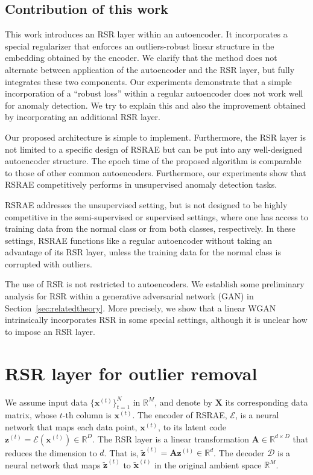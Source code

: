 \documentclass{article} \usepackage{iclr2020_conference,times}
\def\Secref#1{Section~\ref{#1}}
\def\rvx{{\mathbf{x}}}
\def\rvz{{\mathbf{z}}}
\def\rmA{{\mathbf{A}}}
\def\rmX{{\mathbf{X}}}
\newcommand{\R}{\mathbb{R}}
\begin{document}
\subsection{Contribution of this work}
\label{subsec:contribution}
This work introduces an RSR layer within an autoencoder. 
It incorporates a special regularizer that enforces an outliers-robust linear structure in the embedding obtained by the encoder. 
We clarify that the method does not alternate between application of the autoencoder and the RSR layer, but fully integrates these two components. Our experiments demonstrate that a simple incorporation of a ``robust loss'' within a regular autoencoder does not work well for anomaly detection. We try to explain this and also the improvement obtained by incorporating an additional RSR layer.


Our proposed architecture is simple to implement. Furthermore, the RSR layer is not limited to a specific design of RSRAE but can be put into any well-designed autoencoder structure. 
The epoch time of the proposed algorithm is comparable to those of other common autoencoders. 
Furthermore, our experiments show that RSRAE competitively performs in unsupervised anomaly detection tasks.

{RSRAE addresses the unsupervised setting, but is not designed to be highly competitive in the semi-supervised or supervised settings, where one has access to training data from the normal class or from both classes, respectively. In these settings, RSRAE functions like a regular autoencoder without taking an advantage of its RSR layer, unless the training data for the normal class is  corrupted with outliers.}



The use of RSR is not restricted to autoencoders. 
We establish some preliminary analysis for RSR within a generative adversarial network (GAN) \citep{goodfellow2014generative, arjovsky2017wasserstein} in \Secref{sec:relatedtheory}.
More precisely, we show that a linear WGAN intrinsically incorporates RSR in some special settings, although it is unclear how to impose 
an RSR layer. 

\section{RSR layer for outlier removal}
\label{sec:alg_describe}
We assume input data $\{\rvx^{(t)}\}_{t=1}^N$ in $\R^M$, and denote by $\rmX$ its corresponding data matrix, whose $t$-th column is $\rvx^{(t)}$. The encoder of RSRAE, $\mathscr{E}$, is a neural network that maps each data point, $\rvx^{(t)}$, to its latent code $\rvz^{(t)} = \mathscr{E}(\rvx^{(t)}) \in \R^D$. The RSR layer is a linear transformation $\rmA \in \R^{d \times D}$ that reduces the dimension to $d$. That is, $\tilde{\rvz}^{(t)} = \rmA \rvz^{(t)} \in \R^d$. The decoder $\mathscr{D}$ is a neural network that maps $\tilde{\rvz}^{(t)}$ to $\tilde{\rvx}^{(t)}$ in the original ambient space $\R^M$.
\end{document}
